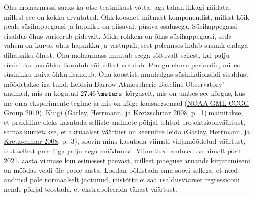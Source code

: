 \documentclass[
  12pt,
  a4paper,
  onecolumn, twoside]{article}
\newenvironment{Shaded}{\begin{snugshade}}{\end{snugshade}}
\newcommand{\AttributeTok}[1]{\textcolor[rgb]{0.77,0.63,0.00}{#1}}
\newcommand{\CommentTok}[1]{\textcolor[rgb]{0.56,0.35,0.01}{\textit{#1}}}
\newcommand{\ConstantTok}[1]{\textcolor[rgb]{0.00,0.00,0.00}{#1}}
\newcommand{\FloatTok}[1]{\textcolor[rgb]{0.00,0.00,0.81}{#1}}
\newcommand{\FunctionTok}[1]{\textcolor[rgb]{0.00,0.00,0.00}{#1}}
\newcommand{\NormalTok}[1]{#1}
\newcommand{\OtherTok}[1]{\textcolor[rgb]{0.56,0.35,0.01}{#1}}
\newcommand{\SpecialCharTok}[1]{\textcolor[rgb]{0.00,0.00,0.00}{#1}}
\newcommand{\StringTok}[1]{\textcolor[rgb]{0.31,0.60,0.02}{#1}}
\begin{document}
Õhu molaarmassi saaks ka otse teatmikust võtta, aga tahan ikkagi näidata, millest see on kokku arvutatud. Õhk koosneb mitmest komponendist, millest kõik peale süsihappegaasi ja hapniku on piisavalt püsiva osalusega. Süsihappegaasi sisaldus õhus varieerub pidevalt. Mida rohkem on õhus süsihappegaasi, seda vähem on kuivas õhus hapnikku ja vastupidi, sest põlemises liidab süsinik endaga dihapniku õhust. Õhu molaarmass muutub seega sõltuvalt sellest, kui palju süsinikku kas õhku lisandub või sellest eraldub. Praegu elame perioodis, milles süsinikku kuiva õhku lisandub. Õhu koostist, muuhulgas süsinikdioksiidi sisaldust mõõdetakse iga tund. Leidsin Barrow Atmospheric Baseline Observatory' andmed, mis on kogutud \(\qty{27.46}{\meters}\) kõrguselt, mis on umbes see kõrgus, kus me oma eksperimente tegime ja mis on kõige kaasaegsemad (\protect\hyperlink{ref-NOAA_GML_CCGG_Group2019-oq}{NOAA GML CCGG Group 2019}). Kuigi (\protect\hyperlink{ref-RN23688432420080101}{Gatley, Herrmann, ja Kretzschmar 2008}, p.~1) mainitakse, et praktiline oleks kasutada selliste andmete põhjal tehtud projektsioonväärtust, samas kurdetakse, et aktuaalset väärtust on keeruline leida (\protect\hyperlink{ref-RN23688432420080101}{Gatley, Herrmann, ja Kretzschmar 2008}, p.~3), soovin mina kasutada viimati väljamõõdetud väärtust, sest sellest pole liiga palju aega möödunud. Viimatised andmed on nimelt pärit 2021. aasta viimase kuu esimesest päevast, millest praeguse aruande kirjutamiseni on möödas veidi üle poole aasta. Loodan põhistada oma soovi sellega, et need andmed pole normaalselt jaotunud, mistõttu ei saa usaldusväärset regressiooni nende põhjal teostada, et ekstrapoleerida tänast väärtust.

\begin{Shaded}
\end{Shaded}
\end{document}
